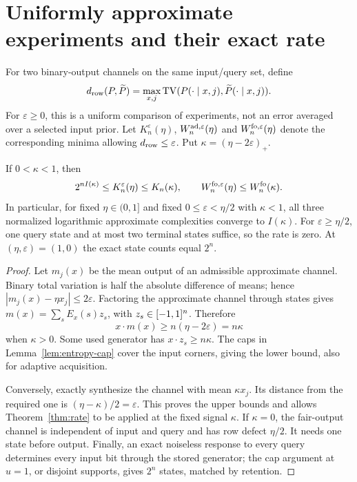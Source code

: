 \section{Uniformly approximate experiments and their exact rate}
\label{sec:approximation}
For two binary-output channels on the same input/query set, define
\[
 d_{\rm row}(P,\widetilde P)=
     \max_{x,j}\operatorname{TV}(P(\cdot\mid x,j),\widetilde P(\cdot\mid x,j)).
\]
For $\varepsilon\ge0$, this is a uniform comparison of experiments, not an error averaged over
a selected input prior. Let $K_n^\varepsilon(\eta)$,
$W_n^{{\rm ad},\varepsilon}(\eta)$ and
$W_n^{{\rm fo},\varepsilon}(\eta)$ denote the corresponding minima
allowing $d_{\rm row}\le\varepsilon$. Put
$\kappa=(\eta-2\varepsilon)_+$.

\begin{theorem}\label{thm:approx-rate}
If $0<\kappa<1$, then
\begin{equation}\label{eq:approx-sandwich}
 2^{nI(\kappa)}\le K_n^\varepsilon(\eta)
 \le K_n(\kappa),\qquad
 W_n^{{\rm fo},\varepsilon}(\eta)\le W_n^{\rm fo}(\kappa).
\end{equation}
In particular, for fixed $\eta\in(0,1]$ and fixed
$0\le\varepsilon<\eta/2$ with $\kappa<1$, all three normalized
logarithmic approximate complexities converge to $I(\kappa)$.
For $\varepsilon\ge\eta/2$, one query state and at most two terminal
states suffice, so the rate is zero. At $(\eta,\varepsilon)=(1,0)$
the exact state counts equal $2^n$.
\end{theorem}
\begin{proof}
Let $m_j(x)$ be the mean output of an admissible approximate channel.
Binary total variation is half the absolute difference of means; hence
$|m_j(x)-\eta x_j|\le2\varepsilon$. Factoring the approximate
channel through states gives $m(x)=\sum_sE_x(s)z_s$, with
$z_s\in[-1,1]^n$. Therefore
\[
                  x\cdot m(x)\ge n(\eta-2\varepsilon)=n\kappa
\]
when $\kappa>0$. Some used generator has $x\cdot z_s\ge n\kappa$.
The caps in Lemma~\ref{lem:entropy-cap} cover the input corners, giving
the lower bound, also for adaptive acquisition.

Conversely, exactly synthesize the channel with mean $\kappa x_j$.
Its distance from the required one is $(\eta-\kappa)/2=\varepsilon$.
This proves the upper bounds and allows Theorem~\ref{thm:rate} to be
applied at the fixed signal $\kappa$. If $\kappa=0$, the fair-output
channel is independent of input and query and has row defect $\eta/2$.
It needs one state before output. Finally, an exact noiseless response
to every query determines every input bit through the stored generator;
the cap argument at $u=1$, or disjoint supports, gives $2^n$ states,
matched by retention.
\end{proof}

